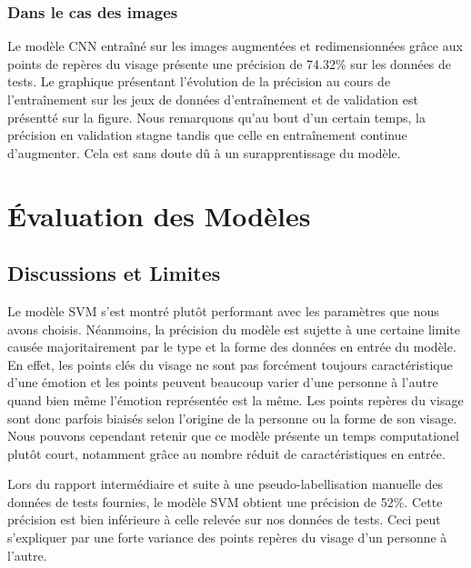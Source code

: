 \documentclass{rapport}
\begin{document}
\subsubsection{Dans le cas des images}
Le modèle CNN entraîné sur les images augmentées et redimensionnées grâce aux points de repères du visage présente une précision
de 74.32\% sur les données de tests. Le graphique présentant l'évolution de la précision au cours de l'entraînement
sur les jeux de données d'entraînement et de validation est présentté sur la figure. Nous remarquons qu'au bout d'un certain temps, la précision
en validation stagne tandis que celle en entraînement continue d'augmenter. Cela est sans doute dû à un surapprentissage du modèle.


\section{Évaluation des Modèles}
\subsection{Discussions et Limites}

Le modèle SVM s'est montré plutôt performant avec les paramètres que nous avons choisis. Néanmoins, la précision du modèle est sujette à une certaine limite causée
majoritairement par le type et la forme des données en entrée du modèle. En effet, les points clés du visage ne sont pas forcément toujours caractéristique d'une émotion
et les points peuvent beaucoup varier d'une personne à l'autre quand bien même l'émotion représentée est la même. Les points repères du visage sont donc parfois biaisés selon
l'origine de la personne ou la forme de son visage. Nous pouvons cependant retenir que ce modèle présente un temps computationel plutôt court, notamment grâce au nombre réduit
de caractéristiques en entrée.

Lors du rapport intermédiaire et suite à une pseudo-labellisation manuelle des données de tests fournies, le modèle SVM obtient une précision de 52\%.
Cette précision est bien inférieure à celle relevée sur nos données de tests. Ceci peut s'expliquer par une forte variance des points repères du visage
d'un personne à l'autre.\\
\end{document}
